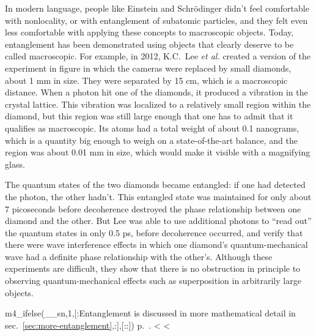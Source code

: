 In modern language, people like Einstein and Schr\"odinger didn't feel
comfortable with nonlocality, or with entanglement of subatomic
particles, and they felt even less comfortable with applying these
concepts to macroscopic objects. Today, entanglement has been
demonstrated using objects that clearly deserve to be called
macroscopic.\label{macroscopic-entanglement}
For example, in 2012, K.C.~Lee \emph{et al.} created a
version of the experiment in figure  in which
the cameras were replaced by small diamonds, about 1 mm in size.  They
were separated by 15 cm, which is a macroscopic distance. When a
photon hit one of the diamonds, it produced a vibration in the crystal
lattice.  This vibration was localized to a relatively small region
within the diamond, but this region was still large enough that one
has to admit that it qualifies as macroscopic. Its atoms had a total
weight of about 0.1 nanograms, which is a quantity big enough to weigh
on a state-of-the-art balance, and the region was about 0.01 mm in
size, which would make it visible with a magnifying glass. 

The quantum states of the two diamonds became entangled: if one had
detected the photon, the other hadn't. This entangled state was
maintained for only about 7 picoseconds before decoherence destroyed
the phase relationship between one diamond and the other. But Lee was
able to use additional photons to ``read out'' the quantum states in
only 0.5 ps, before decoherence occurred, and verify that there were
wave interference effects in which one diamond's quantum-mechanical
wave had a definite phase relationship with the other's.  Although
these experiments are difficult, they show that there is no
obstruction in principle to observing quantum-mechanical effects such
as superposition in arbitrarily large objects. 

m4_ifelse(__sn,1,[:Entanglement is discussed in more mathematical detail in sec.~\ref{sec:more-entanglement},:],[::])
p.~\pageref{sec:more-entanglement}.
<%
<%
